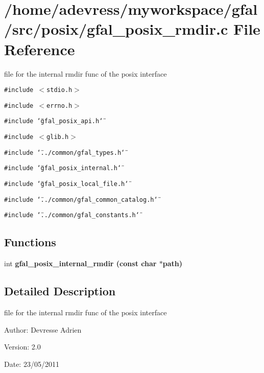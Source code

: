 \section{/home/adevress/myworkspace/gfal/src/posix/gfal\_\-posix\_\-rmdir.c File Reference}
\label{gfal__posix__rmdir_8c}
file for the internal rmdir func of the posix interface 

{\tt \#include $<$stdio.h$>$}\par
{\tt \#include $<$errno.h$>$}\par
{\tt \#include \char`\"{}gfal\_\-posix\_\-api.h\char`\"{}}\par
{\tt \#include $<$glib.h$>$}\par
{\tt \#include \char`\"{}../common/gfal\_\-types.h\char`\"{}}\par
{\tt \#include \char`\"{}gfal\_\-posix\_\-internal.h\char`\"{}}\par
{\tt \#include \char`\"{}gfal\_\-posix\_\-local\_\-file.h\char`\"{}}\par
{\tt \#include \char`\"{}../common/gfal\_\-common\_\-catalog.h\char`\"{}}\par
{\tt \#include \char`\"{}../common/gfal\_\-constants.h\char`\"{}}\par
\subsection*{Functions}
\begin{CompactItemize}
\item 
int \bf{gfal\_\-posix\_\-internal\_\-rmdir} (const char $\ast$path)
\end{CompactItemize}


\subsection{Detailed Description}
file for the internal rmdir func of the posix interface 

\begin{Desc}
\item[Author:]Devresse Adrien \end{Desc}
\begin{Desc}
\item[Version:]2.0 \end{Desc}
\begin{Desc}
\item[Date:]23/05/2011 \end{Desc}


